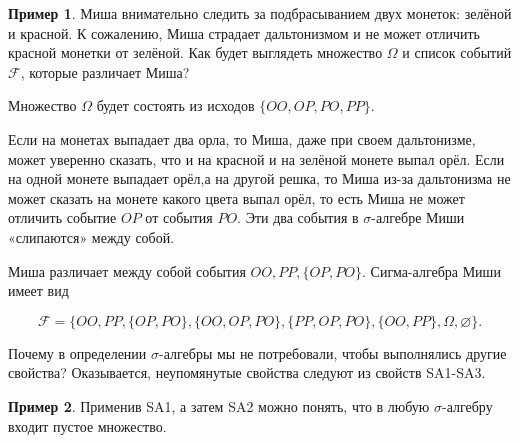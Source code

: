 \documentclass[pdftex, 12pt, a4paper]{article}
\def\F{\ensuremath{\mathcal{F}}} %
\def \sg{\sigma}
\def \Om{\Omega}
\theoremstyle{definition} %
\newtheorem{myex}{Пример}
\numberwithin{problem}{section}
\numberwithin{blits}{section}
\begin{document}
\begin{myex}
Миша внимательно следить за подбрасыванием двух монеток: зелёной и красной. К сожалению, Миша страдает дальтонизмом и не может отличить красной монетки от зелёной. Как будет выглядеть множество $\Om$ и список событий $\F$, которые различает Миша?

Множество $\Om$ будет состоять из исходов $\{OO,OP,PO,PP\}$.

Если на монетах выпадает два орла, то Миша, даже при своем дальтонизме, может уверенно сказать, что и на красной и на зелёной монете выпал орёл. Если на одной монете выпадает орёл,а на другой решка, то Миша из-за дальтонизма не может сказать на монете какого цвета выпал орёл, то есть Миша не может отличить событие $OP$ от события $PO$. Эти два события в $\sg$-алгебре Миши «слипаются» между собой. 

Миша различает между собой события $ OO, PP, \{OP, PO\}$. Сигма-алгебра Миши имеет вид

 \[\F = \{OO, PP, \{OP, PO\}, \{OO,OP,PO\}, \{PP,OP,PO\}, \{OO,PP\}, \Om, \varnothing\}.\]  
\end{myex}

Почему в определении $\sigma$-алгебры мы не потребовали, чтобы выполнялись другие свойства? Оказывается, неупомянутые свойства следуют из свойств SA1-SA3.

\begin{myex} Применив SA1, а затем SA2 можно понять, что в любую $\sigma$-алгебру входит пустое множество.
\end{myex}
\end{document}
